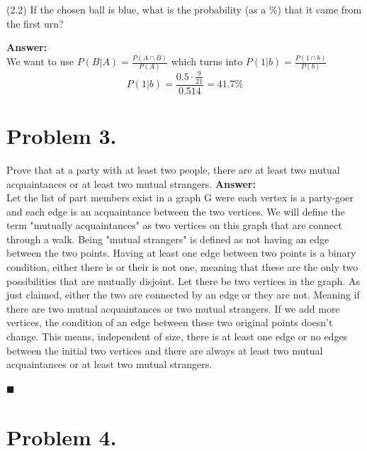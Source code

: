 \documentclass[11pt]{article}
\begin{document}
\noindent
(2.2) If the chosen ball is blue, what is the probability (as a \%) that it
came from the first urn?
\newline
\newline

\noindent
{\bf Answer:}\\

We want to use $P(B|A) = \frac{P(A\cap B)}{P(A)}$ which turns into $P(1|b) = \frac{P(1 \cap b)}{P(b)}$
\[P(1|b) = \frac{0.5 \cdot \frac{9}{21}}{0.514} = 41.7\%\]
\newpage


\section*{Problem 3.}

\noindent
Prove that at a party with at least two people, there are at least two mutual
acquaintances or at least two mutual strangers.
\newline
\newline
\newline
\newline
\newline
\noindent
{\bf Answer:}\\

Let the list of part members exist in a graph G were each vertex is a party-goer and each edge is an acquaintance between the two vertices. We will define the term "mutually acquaintances" as two vertices on this graph that are connect through a walk. Being "mutual strangers" is defined as not having an edge between the two points. Having at least one edge between two points is a binary condition, either there is or their is not one, meaning that these are the only two possibilities that are mutually disjoint. Let there be two vertices in the graph. As just claimed, either the two are connected by an edge or they are not. Meaning if there are two mutual acquaintances or two mutual strangers. If we add more vertices, the condition of an edge between these two original points doesn't change. This means, independent of size, there is at least one edge or no edges between the initial two vertices and there are always at least two mutual acquaintances or at least two mutual strangers.
\begin{flushright}$\blacksquare$\end{flushright}

\newpage

\section*{Problem 4.}
\end{document}
